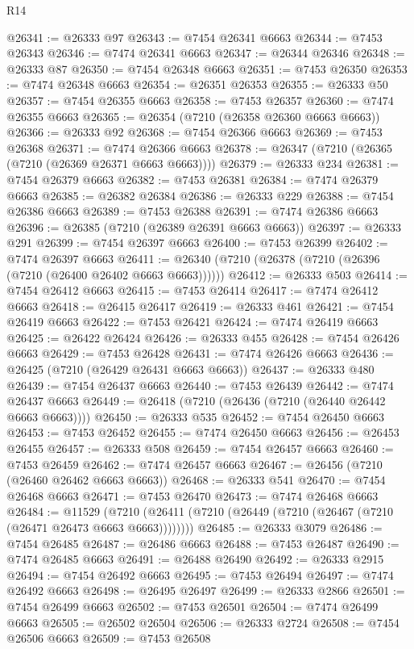 \begin{lexlean}{R14}
\begin{coremodule}
@26341 := @26333 @97
@26343 := @7454 @26341 @6663
@26344 := @7453 @26343
@26346 := @7474 @26341 @6663
@26347 := @26344 @26346
@26348 := @26333 @87
@26350 := @7454 @26348 @6663
@26351 := @7453 @26350
@26353 := @7474 @26348 @6663
@26354 := @26351 @26353
@26355 := @26333 @50
@26357 := @7454 @26355 @6663
@26358 := @7453 @26357
@26360 := @7474 @26355 @6663
@26365 := @26354 (@7210 (@26358 @26360 @6663 @6663))
@26366 := @26333 @92
@26368 := @7454 @26366 @6663
@26369 := @7453 @26368
@26371 := @7474 @26366 @6663
@26378 := @26347 (@7210 (@26365 (@7210 (@26369 @26371 @6663 @6663))))
@26379 := @26333 @234
@26381 := @7454 @26379 @6663
@26382 := @7453 @26381
@26384 := @7474 @26379 @6663
@26385 := @26382 @26384
@26386 := @26333 @229
@26388 := @7454 @26386 @6663
@26389 := @7453 @26388
@26391 := @7474 @26386 @6663
@26396 := @26385 (@7210 (@26389 @26391 @6663 @6663))
@26397 := @26333 @291
@26399 := @7454 @26397 @6663
@26400 := @7453 @26399
@26402 := @7474 @26397 @6663
@26411 := @26340 (@7210 (@26378 (@7210 (@26396 (@7210 (@26400 @26402 @6663 @6663))))))
@26412 := @26333 @503
@26414 := @7454 @26412 @6663
@26415 := @7453 @26414
@26417 := @7474 @26412 @6663
@26418 := @26415 @26417
@26419 := @26333 @461
@26421 := @7454 @26419 @6663
@26422 := @7453 @26421
@26424 := @7474 @26419 @6663
@26425 := @26422 @26424
@26426 := @26333 @455
@26428 := @7454 @26426 @6663
@26429 := @7453 @26428
@26431 := @7474 @26426 @6663
@26436 := @26425 (@7210 (@26429 @26431 @6663 @6663))
@26437 := @26333 @480
@26439 := @7454 @26437 @6663
@26440 := @7453 @26439
@26442 := @7474 @26437 @6663
@26449 := @26418 (@7210 (@26436 (@7210 (@26440 @26442 @6663 @6663))))
@26450 := @26333 @535
@26452 := @7454 @26450 @6663
@26453 := @7453 @26452
@26455 := @7474 @26450 @6663
@26456 := @26453 @26455
@26457 := @26333 @508
@26459 := @7454 @26457 @6663
@26460 := @7453 @26459
@26462 := @7474 @26457 @6663
@26467 := @26456 (@7210 (@26460 @26462 @6663 @6663))
@26468 := @26333 @541
@26470 := @7454 @26468 @6663
@26471 := @7453 @26470
@26473 := @7474 @26468 @6663
@26484 := @11529
    (@7210 (@26411 (@7210 (@26449 (@7210 (@26467 (@7210 (@26471 @26473 @6663 @6663))))))))
@26485 := @26333 @3079
@26486 := @7454 @26485
@26487 := @26486 @6663
@26488 := @7453 @26487
@26490 := @7474 @26485 @6663
@26491 := @26488 @26490
@26492 := @26333 @2915
@26494 := @7454 @26492 @6663
@26495 := @7453 @26494
@26497 := @7474 @26492 @6663
@26498 := @26495 @26497
@26499 := @26333 @2866
@26501 := @7454 @26499 @6663
@26502 := @7453 @26501
@26504 := @7474 @26499 @6663
@26505 := @26502 @26504
@26506 := @26333 @2724
@26508 := @7454 @26506 @6663
@26509 := @7453 @26508

\end{coremodule}
\end{lexlean}
